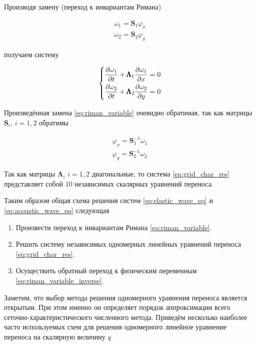 Производя замену (переход к инвариантам Римана)

\begin{equation}
\begin{matrix}
    \omega_1 = \pmb{S}_1 \varphi_x \\
    \omega_2 = \pmb{S}_2 \varphi_y
\end{matrix}
\label{eq:riman_variable}
\end{equation}

получаем систему

\begin{equation}
\begin{dcases}
    \dfrac{\partial \omega_1}{\partial t}  +
    \pmb{\Lambda}_1 \dfrac{\partial \omega_1}{\partial x} = 0 \\
    \dfrac{\partial \omega_2}{\partial t} + 
    \pmb{\Lambda}_2 \dfrac{\partial \omega_2}{\partial y} = 0
\end{dcases}
\label{eq:grid_char_res}
\end{equation}

Произведённая замена \eqref{eq:riman_variable} очевидно обратимая, так как матрицы $\pmb{S}_i$, $i=1,2$ обратимы

\begin{equation}
\begin{matrix}
    \varphi_x  = \pmb{S}_1^{-1} \omega_1  \\
    \varphi_y  = \pmb{S}_2^{-1} \omega_2
\end{matrix}
\label{eq:riman_variable_inverse}
\end{equation}

Так как матрицы $\pmb{\Lambda}_i$ $i=1,2$ диагональные, то система \eqref{eq:grid_char_res} представляет собой 10 независимых скалярных уравнений переноса.

Таким образом общая схема решения систем \eqref{eq:elastic_wave_eq} и \eqref{eq:acoustic_wave_eq} следующая

\begin{enumerate}
    \item Произвести переход к инвариантам Римана \eqref{eq:riman_variable}.
    \item Решить систему независимых одномерных линейных уравнений переноса \eqref{eq:grid_char_res}.
    \item Осуществить обратный переход к физическим переменным \eqref{eq:riman_variable_inverse}.
\end{enumerate}

Заметим, что выбор метода решения одномерного уравнения переноса является открытым. При этом именно он определяет порядок аппроксимации всего сеточно-характеристического численного метода. Приведём несколько наиболее часто используемых схем для решения одномерного линейное уравнение переноса на скалярную величину $q$

